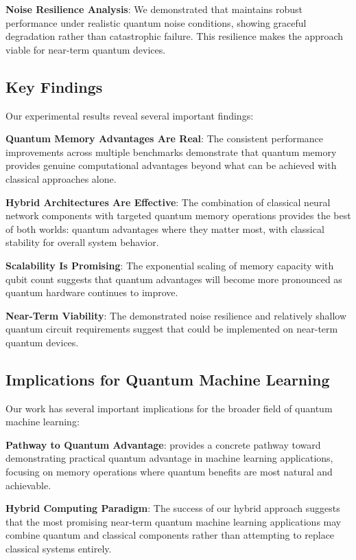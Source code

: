 \textbf{Noise Resilience Analysis}: We demonstrated that \qmnn maintains robust performance under realistic quantum noise conditions, showing graceful degradation rather than catastrophic failure. This resilience makes the approach viable for near-term quantum devices.

\subsection{Key Findings}

Our experimental results reveal several important findings:

\textbf{Quantum Memory Advantages Are Real}: The consistent performance improvements across multiple benchmarks demonstrate that quantum memory provides genuine computational advantages beyond what can be achieved with classical approaches alone.

\textbf{Hybrid Architectures Are Effective}: The combination of classical neural network components with targeted quantum memory operations provides the best of both worlds: quantum advantages where they matter most, with classical stability for overall system behavior.

\textbf{Scalability Is Promising}: The exponential scaling of memory capacity with qubit count suggests that quantum advantages will become more pronounced as quantum hardware continues to improve.

\textbf{Near-Term Viability}: The demonstrated noise resilience and relatively shallow quantum circuit requirements suggest that \qmnn could be implemented on near-term quantum devices.

\subsection{Implications for Quantum Machine Learning}

Our work has several important implications for the broader field of quantum machine learning:

\textbf{Pathway to Quantum Advantage}: \qmnn provides a concrete pathway toward demonstrating practical quantum advantage in machine learning applications, focusing on memory operations where quantum benefits are most natural and achievable.

\textbf{Hybrid Computing Paradigm}: The success of our hybrid approach suggests that the most promising near-term quantum machine learning applications may combine quantum and classical components rather than attempting to replace classical systems entirely.

